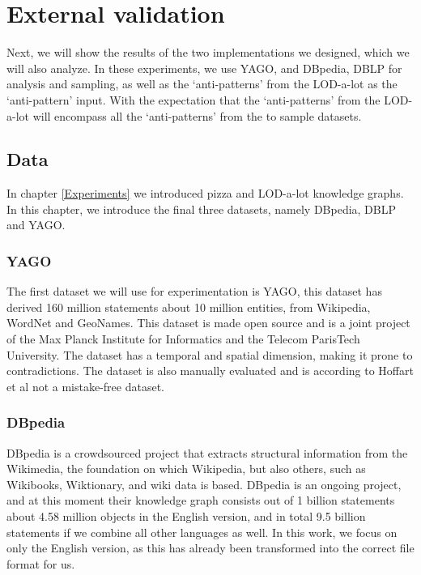 \documentclass[11pt,letterpaper ,oneside ]{book}
\begin{document}
	\newpage
	\chapter{External validation}\label{ExternalExperiments}
	Next, we will show the results of the two implementations we designed, which we will also analyze. In these experiments, we use YAGO, and DBpedia, DBLP for analysis and sampling, as well as the `anti-patterns' from the LOD-a-lot as the `anti-pattern' input. With the expectation that the `anti-patterns' from the LOD-a-lot will encompass all the `anti-patterns' from the to sample datasets.\\
	
	\section{Data}
	In chapter \ref{Experiments} we introduced pizza and LOD-a-lot knowledge graphs. In this chapter, we introduce the final three datasets, namely DBpedia, DBLP and YAGO.
	
	\subsection{YAGO}
	The first dataset we will use for experimentation is YAGO\cite{YAGO2:2013}, this dataset has derived 160 million statements about 10 million entities, from Wikipedia, WordNet and GeoNames. This dataset is made open source and is a joint project of the Max Planck Institute for Informatics and the Telecom ParisTech University. The dataset has a temporal and spatial dimension, making it prone to contradictions. The dataset is also manually evaluated and is according to Hoffart et al\cite{YAGO2:2013} not a mistake-free dataset.
	
	\subsection{DBpedia}
	DBpedia\cite{DBpedia} is a crowdsourced project that extracts structural information from the Wikimedia, the foundation on which Wikipedia, but also others, such as Wikibooks, Wiktionary, and wiki data is based. DBpedia is an ongoing project, and at this moment their knowledge graph consists out of 1 billion statements about 4.58 million objects in the English version, and in total 9.5 billion statements if we combine all other languages as well. In this work, we focus on only the English version, as this has already been transformed into the correct file format for us. 
	
\end{document}
